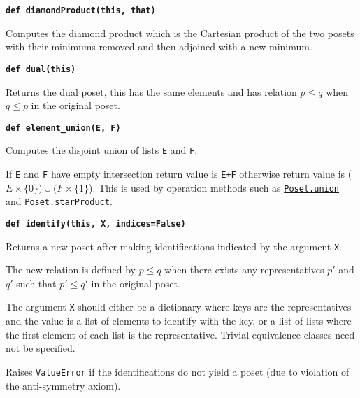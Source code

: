 \documentclass[12pt]{article}
\begin{document}
\begin{child}
{{}\endlist}

\textbf{\hypertarget{Poset.diamondProduct}{\texttt{def diamondProduct(this, that)}}}
{\list{}{\leftmargin 0.5cm}\item{
Computes the diamond product which is the Cartesian product of the two posets with their minimums removed and then adjoined with a new minimum.


}\endlist}

\textbf{\hypertarget{Poset.dual}{\texttt{def dual(this)}}}
{\list{}{\leftmargin 0.5cm}\item{
Returns the dual poset, this has the same elements and has relation $p\le q$ when $q\le p$ in the original poset.


}\endlist}

\textbf{\hypertarget{Poset.element_union}{\texttt{def element\_union(E, F)}}}
{\list{}{\leftmargin 0.5cm}\item{
Computes the disjoint union of lists \verb|E| and \verb|F|.

If \verb|E| and \verb|F| have empty intersection return value is \verb|E+F|
otherwise return value is ($E\times\{0\})\cup(F\times\{1\}$). This is used by operation methods
such as \hyperlink{Poset.union}{\texttt{Poset.union}} and \hyperlink{Poset.starProduct}{\texttt{Poset.starProduct}}.


}\endlist}

\textbf{\hypertarget{Poset.identify}{\texttt{def identify(this, X, indices=False)}}}
{\list{}{\leftmargin 0.5cm}\item{
Returns a new poset after making identifications indicated by the argument \verb|X|.

The new relation is defined by $p\le q$ when there exists any representatives $p'$ and $q'$ such that $p'\le q'$ in the original poset.

The argument \verb|X| should either be a dictionary where keys are the representatives and the value is a list of elements
to identify with the key, or a list of lists where the first element of each list is the representative.
Trivial equivalence classes need not be specified.

Raises \verb|ValueError| if the identifications do not yield a poset (due to violation of the anti-symmetry axiom).


}}
\end{child}
\end{document}
